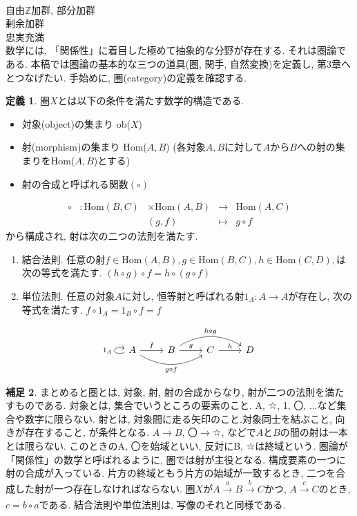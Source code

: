 \documentclass[a4paper]{jsarticle}
\theoremstyle{definition}
\newtheorem{dfn}{定義}[section]
\newtheorem{hsk}[dfn]{補足}
\newcommand{\Hom}{{\mathrm{Hom}}}
\begin{document}
\noindent\\

自由$\mathbb{Z}$加群, 部分加群\\
剰余加群\\
忠実充満\\
数学には, 「関係性」に着目した極めて抽象的な分野が存在する. それは圏論である. 本稿では圏論の基本的な三つの道具(圏, 関手, 自然変換)を定義し, 第3章へとつなげたい. 手始めに, 圏(category)の定義を確認する.
\begin{dfn}
圏$X$とは以下の条件を満たす数学的構造である. 
\begin{itemize}
    \item 対象(object)の集まり ob($X$)
    \item 射(morphism)の集まり Hom($A,B$)
    (各対象$A, B$に対して$A$から$B$への射の集まりをHom($A, B$)とする)
    \item 射の合成と呼ばれる関数$(\circ)$
\end{itemize}
\begin{equation}
    \begin{array}{lllll}
     \circ &: \Hom (B, C) &\times \Hom (A, B) &\rightarrow &\Hom (A, C)  \\
         &    & (g,f) & \mapsto&  g\circ f
\end{array}
\end{equation}
から構成され, 射は次の二つの法則を満たす.
\begin{enumerate}[(1)]
    \item 結合法則. 任意の射$f\in \Hom(A,B), g\in \Hom(B,C), h\in \Hom(C,D),$は次の等式を満たす. $(h \circ g) \circ f = h \circ (g \circ f)$  
    \item 単位法則. 任意の対象$A$に対し, 恒等射と呼ばれる射$1_A:A\rightarrow A$が存在し, 次の等式を満たす.  $f\circ 1_A = 1_B\circ f = f$  
\end{enumerate}
\begin{equation}
    \begin{tikzcd}
    A\ar{r}{f} \ar[loop left,"1_A"] \ar[bend right=30,swap]{rr}{g\circ f}& B\ar{r}{g} \ar[bend left=30]{rr}{h\circ g}& C\ar{r}{h} & D
\end{tikzcd}
\end{equation}
\end{dfn}

\begin{hsk}
まとめると圏とは, 対象, 射, 射の合成からなり, 射が二つの法則を満たすものである.
対象とは, 集合でいうところの要素のこと. A, ☆, 1, 〇, ...など集合や数字に限らない.
射とは, 対象間に走る矢印のこと.対象同士を結ぶこと, 向きが存在すること, が条件となる. $A \rightarrow B$, 〇$\rightarrow$☆, などで$A$と$B$の間の射は一本とは限らない. このときのA, 〇を始域といい, 反対にB, ☆は終域という. 圏論が「関係性」の数学と呼ばれるように, 圏では射が主役となる. 構成要素の一つに射の合成が入っている. 片方の終域ともう片方の始域が一致するとき, 二つを合成した射が一つ存在しなければならない. 圏$X$が$A\xrightarrow[]{a} B\xrightarrow[]{b} C$かつ, $A\xrightarrow[]{c} C$のとき, $c=b\circ a$である. 結合法則や単位法則は, 写像のそれと同様である. 
\\
\end{hsk}
\end{document}
